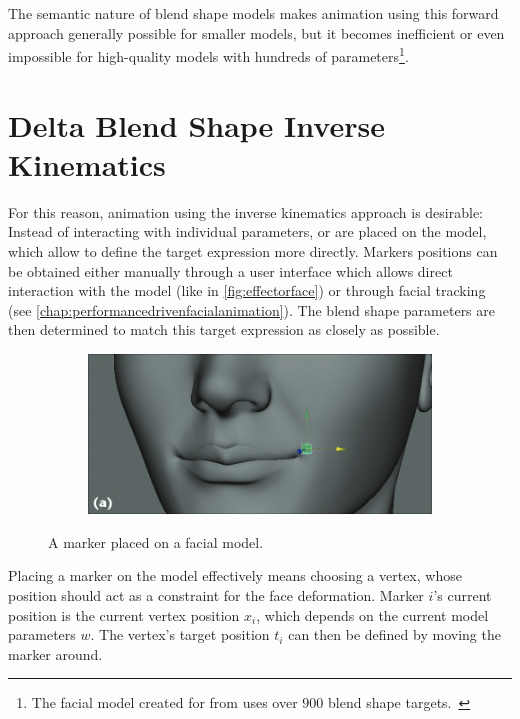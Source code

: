The semantic nature of blend shape models makes animation using this forward approach generally possible for smaller models,
but it becomes inefficient or even impossible for high-quality models with hundreds of parameters\footnote{
  The facial model created for  from  uses over \(900\) blend shape targets.~\autocite{computeranimation}
}.

\section{Delta Blend Shape Inverse Kinematics}
\label{sec:blendshapeinversekinematics}

For this reason, animation using the inverse kinematics approach is desirable:
Instead of interacting with individual parameters,
 or  are placed on the model,
which allow to define the target expression more directly.
Markers positions can be obtained either manually through a user interface which allows direct interaction with the model (like in \autoref{fig:effectorface}) or through facial tracking (see \autoref{chap:performancedrivenfacialanimation}).
The blend shape parameters are then determined to match this target expression as closely as possible.

\begin{figure}[h]
  \centering
  \begin{subfigure}[b]{0.53\textwidth}
	\includegraphics[scale=0.3]{img/effector_face.png}
  \end{subfigure}
  \caption{A marker placed on a facial model.~\autocite{directmanipulationblendshapes}}
  \label{fig:effectorface}
\end{figure}

Placing a marker on the model effectively means choosing a vertex,
whose position should act as a constraint for the face deformation.
Marker \(i\)'s current position is the current vertex position \(x_i\),
which depends on the current model parameters \(w\).
The vertex's target position \(t_i\) can then be defined by moving the marker around.

